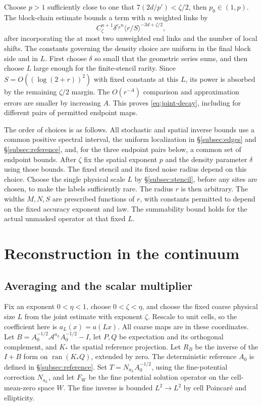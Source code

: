 \documentclass[11pt]{article}
\begin{document}
Choose \(p>1\) sufficiently close to one that \(7(2d/p')<\zeta/2\), then \(p_0\in(1,p)\). The block-chain estimate bounds a term with \(n\) weighted links by \[
C_\zeta^{n+1}\delta^{c_p n}
 \langle r/S\rangle^{-3d+\zeta/2},
\] after incorporating the at most two unweighted end links and the number of local shifts. The constants governing the density choice are uniform in the final block side and in \(L\). First choose \(\delta\) so small that the geometric series sums, and then choose \(L\) large enough for the finite-stencil rarity. Since \(S=O((\log(2+r))^2)\) with fixed constants at this \(L\), its power is absorbed by the remaining \(\zeta/2\) margin. The \(O(r^{-A})\) comparison and approximation errors are smaller by increasing \(A\). This proves \eqref{eq:joint-decay}, including for different pairs of permitted endpoint maps.

The order of choices is as follows. All stochastic and spatial inverse bounds use a common positive spectral interval, the uniform localization in \S\ref{subsec:edges} and \S\ref{subsec:reference}, and, for the three endpoint pairs below, a common set of endpoint bounds. After \(\zeta\) fix the spatial exponent \(p\) and the density parameter \(\delta\) using those bounds. The fixed stencil and its fixed noise radius depend on this choice. Choose the single physical scale \(L\) by \S\ref{subsec:stencil}, before any sites are chosen, to make the labels sufficiently rare. The radius \(r\) is then arbitrary. The widths \(M,N,S\) are prescribed functions of \(r\), with constants permitted to depend on the fixed accuracy exponent and law. The summability bound holds for the actual unmasked operator at that fixed \(L\).

\section{Reconstruction in the continuum}\label{sec:bloch}

\subsection{Averaging and the scalar multiplier}\label{subsec:bloch}

Fix an exponent \(0<\eta<1\), choose \(0<\zeta<\eta\), and choose the fixed coarse physical size \(L\) from the joint estimate with exponent \(\zeta\). Rescale to unit cells, so the coefficient here is \(a_L(x)=a(Lx)\). All coarse maps are in these coordinates. Let \(B=A_0^{-1/2}\mathcal A^{a_L}A_0^{-1/2}-I\), let \(P,Q\) be expectation and its orthogonal complement, and \(K_*\) the spatial reference projection. Let \(R_B\) be the inverse of the \(I+B\) form on \(\operatorname{ran}(K_*Q)\), extended by zero. The deterministic reference \(A_0\) is defined in \S\ref{subsec:reference}. Set \(T=N_{a_L}A_0^{-1/2}\), using the fine-potential correction \(N_{a_L}\), and let \(F_W\) be the fine potential solution operator on the cell-mean-zero space \(W\). The fine inverse is bounded \(L^2\to L^2\) by cell Poincaré and ellipticity.
\end{document}
